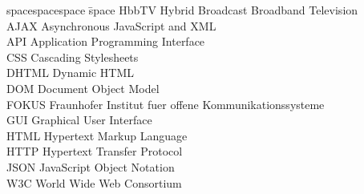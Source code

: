 
\begin{tabbing}
spacespacespace \= space \kill
HbbTV \> Hybrid Broadcast Broadband Television\\
AJAX \> Asynchronous JavaScript and XML\\
API \> Application Programming Interface\\
CSS \> Cascading Stylesheets\\
DHTML \> Dynamic HTML\\
DOM \> Document Object Model\\
FOKUS \> Fraunhofer Institut fuer offene Kommunikationssysteme\\
GUI \> Graphical User Interface\\
HTML \> Hypertext Markup Language\\
HTTP \> Hypertext Transfer Protocol\\
JSON \> JavaScript Object Notation\\
W3C \> World Wide Web Consortium\\
\end{tabbing}
\endinput

